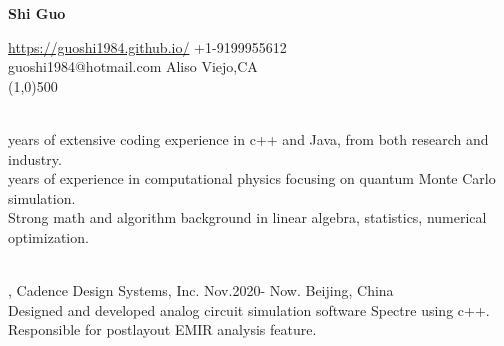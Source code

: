 \documentclass[11pt]{article} %
\begin{document}
 \centerline{\Large \bf Shi Guo}
 \noindent \url{https://guoshi1984.github.io/} \hspace{80mm}  +1-9199955612\\
    guoshi1984@hotmail.com \hspace{95mm}   Aliso Viejo,CA\\
\line(1,0){500}


\vspace{4mm}

 \\
 years of extensive coding experience in c++ and Java, from both research and industry.\\
 years of experience in computational physics focusing on quantum Monte Carlo simulation.\\
\noindent Strong math and algorithm background in linear algebra, statistics, numerical optimization.\\



\vspace{0mm}

\\
, Cadence Design Systems, Inc. Nov.2020- Now. Beijing, China\\
\noindent Designed and developed analog circuit simulation software Spectre using c++. Responsible for postlayout EMIR analysis feature.\\ 
\vspace{-0.5mm}
\end{document}
